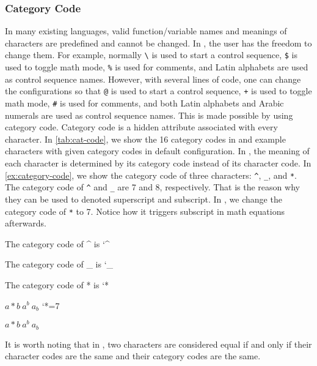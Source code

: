\subsubsection{Category Code}
In many existing languages, valid function/variable names and meanings of characters are predefined and cannot be changed.
In \LT{}, the user has the freedom to change them.
For example, normally \verb|\| is used to start a control sequence, \verb|$| is used to toggle math mode, \verb|%| is used for comments, and Latin alphabets are used as control sequence names.
However, with several lines of code, one can change the configurations so that \verb|@| is used to start a control sequence, \verb|+| is used to toggle math mode, \verb|#| is used for comments, and both Latin alphabets and Arabic numerals are used as control sequence names.
This is made possible by using category code.
Category code is a hidden attribute associated with every character.
In \cref{tab:cat-code}, we show the 16 category codes in \LT{} and example characters with given category codes in default \LT{} configuration.
In \LT{}, the meaning of each character is determined by its category code instead of its character code. 
In \cref{ex:category-code}, we show the category code of three characters: \verb|^|, \verb|_|, and \verb|*|.
The category code of \verb|^| and \verb|_| are 7 and 8, respectively. 
That is the reason why they can be used to denoted superscript and subscript.
In , we change the category code of \verb|*| to 7.
Notice how it triggers subscript in math equations afterwards.
\begin{latexsample}[examplelabel={ex:category-code},exampletitle={Category Code}]
\par The category code of \^{} is \the\catcode`^
\par The category code of \_{} is \the\catcode`_
\par The category code of * is \the\catcode`*
\par $a*b~a^b~a_b$
\catcode`*=7
\par $a*b~a^b~a_b$
\end{latexsample}
\noindent 
It is worth noting that in \LT{}, two characters are considered equal if and only if their character codes are the same and their category codes are the same.


